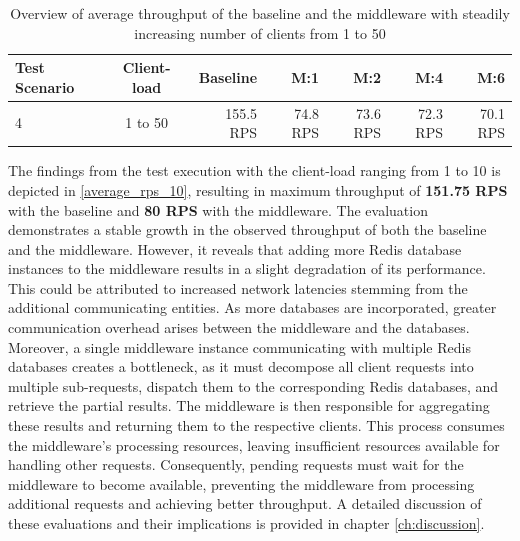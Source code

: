 \begin{table} [H]
\centering
\begin{tabular}{@{} lcrrrrr @{}} %
	\toprule
	Test Scenario & Client-load	&	Baseline	&	M:1	&	M:2  &		M:4  & 	M:6  \\
	\midrule
	4 & 1 to 50	&	155.5 RPS &	74.8 RPS	&	73.6 RPS	&	72.3 RPS	&	70.1 RPS \\
	\bottomrule
\end{tabular}
\caption[Average throughput measured during load-test execution with increasing client-load]{Overview of average throughput of the baseline and the middleware with steadily increasing number of clients from 1 to 50}
\label{tab:summary_varying_client}
\end{table}

\noindent The findings from the test execution with the client-load ranging from 1 to 10 is depicted in \cref{average_rps_10}, resulting in maximum throughput of \textbf{151.75 RPS} with the baseline and \textbf{80 RPS} with the middleware. The evaluation demonstrates a stable growth in the observed throughput of both the baseline and the middleware. However, it reveals that adding more Redis database instances to the middleware results in a slight degradation of its performance. This could be attributed to increased network latencies stemming from the additional communicating entities. As more databases are incorporated, greater communication overhead arises between the middleware and the databases. Moreover, a single middleware instance communicating with multiple Redis databases creates a bottleneck, as it must decompose all client requests into multiple sub-requests, dispatch them to the corresponding Redis databases, and retrieve the partial results. The middleware is then responsible for aggregating these results and returning them to the respective clients. This process consumes the middleware's processing resources, leaving insufficient resources available for handling other requests. Consequently, pending requests must wait for the middleware to become available, preventing the middleware from processing additional requests and achieving better throughput. A detailed discussion of these evaluations and their implications is provided in chapter \ref{ch:discussion}.\\


